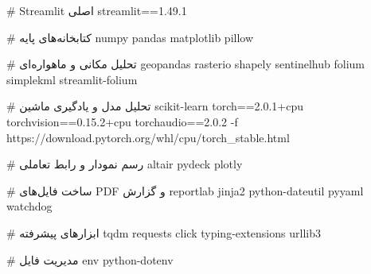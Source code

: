 # Streamlit اصلی
streamlit==1.49.1

# کتابخانه‌های پایه
numpy
pandas
matplotlib
pillow

# تحلیل مکانی و ماهواره‌ای
geopandas
rasterio
shapely
sentinelhub
folium
simplekml
streamlit-folium

# تحلیل مدل و یادگیری ماشین
scikit-learn
torch==2.0.1+cpu
torchvision==0.15.2+cpu
torchaudio==2.0.2
-f https://download.pytorch.org/whl/cpu/torch_stable.html

# رسم نمودار و رابط تعاملی
altair
pydeck
plotly

# ساخت فایل‌های PDF و گزارش
reportlab
jinja2
python-dateutil
pyyaml
watchdog

# ابزارهای پیشرفته
tqdm
requests
click
typing-extensions
urllib3

# مدیریت فایل env
python-dotenv
